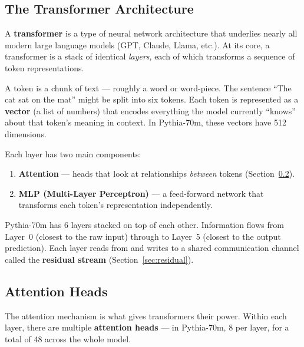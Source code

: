 \documentclass[11pt,a4paper]{article}
\begin{document}
\subsection{The Transformer Architecture}
\label{sec:transformer}

A \textbf{transformer} is a type of neural network architecture that underlies nearly all modern large language models (GPT, Claude, Llama, etc.).
At its core, a transformer is a stack of identical \emph{layers}, each of which transforms a sequence of token representations.

A token is a chunk of text --- roughly a word or word-piece.
The sentence ``The cat sat on the mat'' might be split into six tokens.
Each token is represented as a \textbf{vector} (a list of numbers) that encodes everything the model currently ``knows'' about that token's meaning in context.
In Pythia-70m, these vectors have 512 dimensions.

Each layer has two main components:
\begin{enumerate}[itemsep=2pt]
    \item \textbf{Attention} --- heads that look at relationships \emph{between} tokens (Section~\ref{sec:attention}).
    \item \textbf{MLP (Multi-Layer Perceptron)} --- a feed-forward network that transforms each token's representation independently.
\end{enumerate}

Pythia-70m has 6 layers stacked on top of each other.
Information flows from Layer~0 (closest to the raw input) through to Layer~5 (closest to the output prediction).
Each layer reads from and writes to a shared communication channel called the \textbf{residual stream} (Section~\ref{sec:residual}).

\subsection{Attention Heads}
\label{sec:attention}

The attention mechanism is what gives transformers their power.
Within each layer, there are multiple \textbf{attention heads} --- in Pythia-70m, 8 per layer, for a total of 48 across the whole model.
\end{document}
